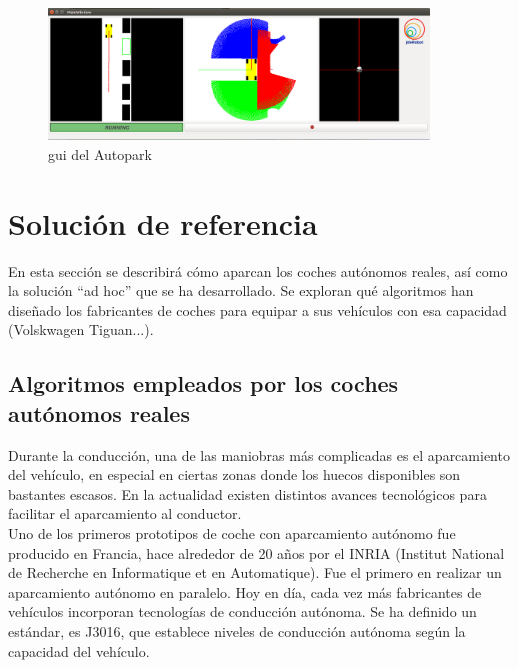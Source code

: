 \begin{figure}[H]
  \begin{center}
    \includegraphics[width=0.9\textwidth]{figures/Autopark/GUI_Autopark.png}
		\caption{\acrshort{gui} del Autopark}
		\label{fig.GUI_Autopark}
		\end{center}
\end{figure}

\section{Solución de referencia}
En esta sección se describirá cómo aparcan los coches autónomos reales, así como la solución ``ad hoc'' que se ha desarrollado. Se exploran qué algoritmos han diseñado los fabricantes de coches para equipar a sus vehículos con esa capacidad (Volskwagen Tiguan...).

\subsection{Algoritmos empleados por los coches autónomos reales}
Durante la conducción, una de las maniobras más complicadas es el aparcamiento del vehículo, en especial en ciertas zonas donde los huecos disponibles son bastantes escasos. En la actualidad existen distintos avances tecnológicos para facilitar el aparcamiento al conductor.\\


Uno de los primeros prototipos de coche con aparcamiento autónomo fue producido en Francia, hace alrededor de 20 años por el INRIA (Institut National de Recherche en Informatique et en Automatique). Fue el primero en realizar un aparcamiento autónomo en paralelo. Hoy en día, cada vez más fabricantes de vehículos incorporan tecnologías de conducción autónoma. Se ha definido un estándar, es J3016, que establece niveles de conducción autónoma según la capacidad del vehículo.

